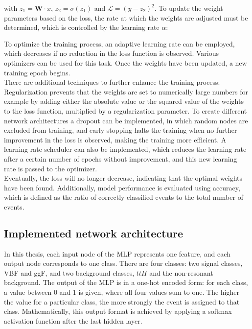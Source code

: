 
with $z_1 = \textbf{W} \cdot x$, $z_2 = \sigma (z_1)$ and $\mathcal{L} = (y - z_2)^2$. 
To update the weight parameters based on the loss, the rate at which the weights are adjusted must be determined, which is controlled by the learning rate $\alpha$:


To optimize the training process, an adaptive learning rate can be employed, which decreases if no reduction in the loss function is observed.
Various optimizers can be used for this task. Once the weights have been updated, a new training epoch begins. \\

There are additional techniques to further enhance the training process: Regularization prevents that the weights are set to numerically large numbers for example by adding either the absolute value
or the squared value of the weights to the loss function, multiplied by a regularization parameter. To create different network architectures a dropout can be implemented, in which random nodes are excluded
from training, and early stopping halts the training when no further improvement in the loss is observed, making the training more efficient.
A learning rate scheduler can also be implemented, which reduces the learning rate after a certain number of epochs without improvement, and this new learning rate is passed to the optimizer. \\

Eventually, the loss will no longer decrease, indicating that the optimal weights have been found. Additionally, model performance is evaluated using accuracy,
which is defined as the ratio of correctly classified events to the total number of events.\\

\subsection{Implemented network architecture}
\label{sec:funcmlp2}

In this thesis, each input node of the MLP represents one feature, and each output node corresponds to one class. There are four classes: two signal classes,
VBF and ggF, and two background classes, $t \bar{t} H$ and the non-resonant background. The output of the MLP is in a one-hot encoded form: for each class, a value between $0$ and $1$ is given,
where all four values sum to one. The higher the value for a particular class, the more strongly the event is assigned to that class. Mathematically, this output format is achieved by applying a
softmax activation function after the last hidden layer. \\

